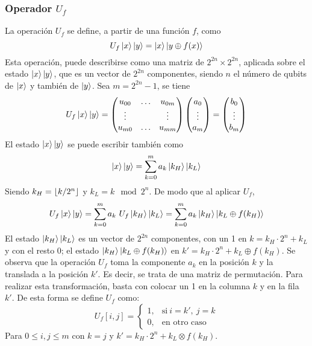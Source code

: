 \subsubsection{Operador $U_f$}
\noindent
La operación $U_f$ se define, a partir de una función $f$, como
$$ U_f \ket{x} \ket{y} = \ket{x} \ket{y \oplus f(x)} $$
Esta operación, puede describirse como una matriz de $2^{2n} \times 2^{2n}$,
aplicada sobre el estado $\ket{x} \ket{y}$, que es un vector de $2^{2n}$ 
componentes, siendo $n$ el número de qubits de $\ket x$ y también de $\ket y$.  
Sea $m = 2^{2n} -1$, se tiene
$$ U_f \ket x \ket y = \begin{pmatrix} 
	u_{00} & \ldots & u_{0m} \\
	\vdots &        & \vdots \\
	u_{m0} & \ldots & u_{mm} \\
 \end{pmatrix}
\begin{pmatrix} 
	a_{0} \\ \vdots \\ a_{m} \\
 \end{pmatrix}
=
\begin{pmatrix} 
	b_{0} \\ \vdots \\ b_{m} \\
 \end{pmatrix}
$$
El estado $\ket{x} \ket{y}$ se puede escribir también como
%
$$ \ket{x} \ket{y} = \sum_{k=0}^m a_k \ket{k_H}\ket{k_L} $$
%
%
Siendo $k_H = \lfloor k/2^n \rfloor$ y $k_L = k \mod 2^n$. De modo que al aplicar $U_f$,
%
$$ U_f \ket x \ket y = \sum_{k=0}^m a_k\ U_f \ket{k_H}\ket{k_L} =
\sum_{k=0}^m a_k \ket{k_H}\ket{k_L \oplus f(k_H)} $$
%
El estado $\ket{k_H} \ket{k_L}$ es un vector de $2^{2n}$ componentes, con un 1 
en $k = k_H \cdot 2^n + k_L$ y con el resto 0; el estado $\ket{k_H}\ket{k_L 
\oplus f(k_H)}$ en $k' = k_H \cdot 2^n + k_L \oplus f(k_H)$.  Se observa que la 
operación $U_f$ toma la componente $a_k$ en la posición $k$ y la translada a la 
posición $k'$.  Es decir, se trata de una matriz de permutación. Para realizar 
esta transformación, basta con colocar un 1 en la columna $k$ y en la fila $k'$.  
De esta forma se define $U_f$ como:
%
\begin{equation*}
U_f[i,j] =
\begin{cases}
1, & \text{si}\ i = k',\ j = k \\
0, & \text{en otro caso}
\end{cases}
\end{equation*}
Para $0 \leq i,j \leq m$ con $k = j$ y $k' = k_H \cdot 2^n + k_L \otimes 
f(k_H)$.


